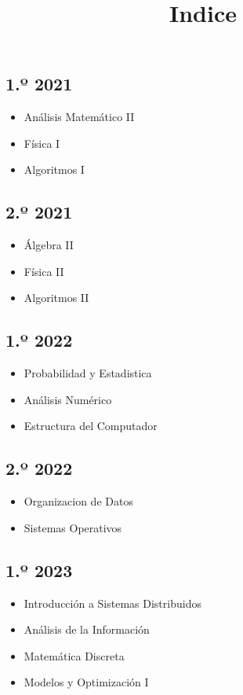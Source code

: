 \documentclass[
]{article}
\title{Indice}
\author{}
\date{}
\providecommand{\tightlist}{%
  \setlength{\itemsep}{0pt}\setlength{\parskip}{0pt}}
\begin{document}
\maketitle

\hypertarget{uxba-2021}{%
\subsection{1.º 2021}\label{uxba-2021}}

\begin{itemize}
\tightlist
\item
  Análisis Matemático II
\item
  Física I
\item
  Algoritmos I
\end{itemize}

\hypertarget{uxba-2021-1}{%
\subsection{2.º 2021}\label{uxba-2021-1}}

\begin{itemize}
\tightlist
\item
  Álgebra II
\item
  Física II
\item
  Algoritmos II
\end{itemize}

\hypertarget{uxba-2022}{%
\subsection{1.º 2022}\label{uxba-2022}}

\begin{itemize}
\tightlist
\item
  Probabilidad y Estadistica
\item
  Análisis Numérico
\item
  Estructura del Computador
\end{itemize}

\hypertarget{uxba-2022-1}{%
\subsection{2.º 2022}\label{uxba-2022-1}}

\begin{itemize}
\tightlist
\item
  Organizacion de Datos
\item
  Sistemas Operativos
\end{itemize}

\hypertarget{uxba-2023}{%
\subsection{1.º 2023}\label{uxba-2023}}

\begin{itemize}
\tightlist
\item
  Introducción a Sistemas Distribuidos
\item
  Análisis de la Información
\item
  Matemática Discreta
\item
  Modelos y Optimización I
\end{itemize}
\end{document}
